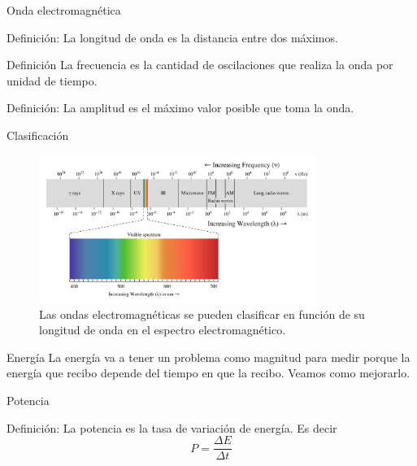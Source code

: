 \documentclass[handout]{beamer}
\begin{document}
\begin{frame}{Onda electromagnética}
  \begin{block}{Definición:}
    La longitud de onda es la distancia entre dos máximos.
  \end{block}
  \begin{block}{Definición}
    La frecuencia es la cantidad de oscilaciones que realiza la onda por unidad de tiempo.
  \end{block}\pause
  \begin{block}{Definición:}
    La amplitud es el máximo valor posible que toma la onda.
  \end{block}
\end{frame}

\begin{frame}{Clasificación}
  \begin{figure}
    \includegraphics[width=0.8\textwidth]{imagenes/espectrum.png}
    \caption{Las ondas electromagnéticas se pueden clasificar en función de su longitud de onda en el espectro electromagnético. }
  \end{figure}
\end{frame}

\begin{frame}{Energía}
  La energía va a tener un problema como magnitud para medir porque la energía que recibo depende del tiempo en que la recibo. Veamos como mejorarlo.
\end{frame}

\begin{frame}{Potencia}
  \begin{block}{Definición:}
    La potencia es la tasa de variación de energía. Es decir
    \begin{equation}
      P = \frac{\Delta E}{\Delta t}
    \end{equation}
  \end{block}
\end{frame}
\end{document}
